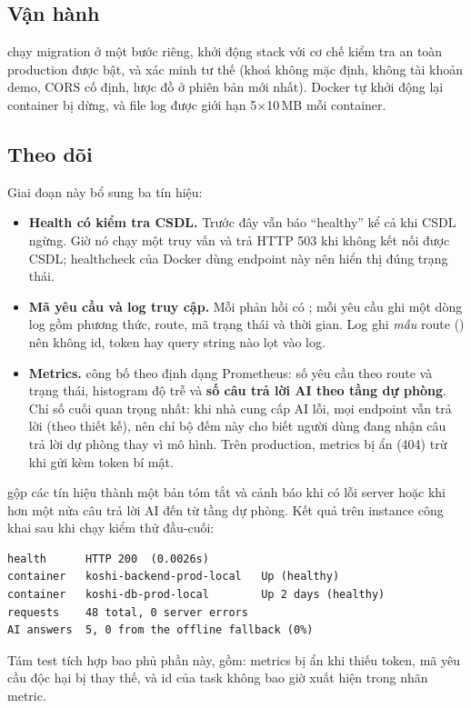 \documentclass[../main.tex]{subfiles}
\begin{document}
\subsection{Vận hành}
 chạy migration ở một bước riêng, khởi động stack với cơ chế kiểm tra
an toàn production được bật, và xác minh tư thế (khoá không mặc định, không tài khoản demo, CORS cố
định, lược đồ ở phiên bản mới nhất). Docker tự khởi động lại container bị dừng, và file log được giới
hạn 5$\times$10\,MB mỗi container.

\subsection{Theo dõi}
Giai đoạn này bổ sung ba tín hiệu:
\begin{itemize}
  \item \textbf{Health có kiểm tra CSDL.} Trước đây  vẫn báo ``healthy'' kể cả khi
        CSDL ngừng. Giờ nó chạy một truy vấn và trả HTTP 503 khi không kết nối được CSDL; healthcheck
        của Docker dùng endpoint này nên  hiển thị đúng trạng thái.
  \item \textbf{Mã yêu cầu và log truy cập.} Mỗi phản hồi có ; mỗi yêu cầu ghi một
        dòng log gồm phương thức, route, mã trạng thái và thời gian. Log ghi \emph{mẫu} route
        () nên không id, token hay query string nào lọt vào log.
  \item \textbf{Metrics.}  công bố theo định dạng Prometheus: số yêu cầu theo route
        và trạng thái, histogram độ trễ và \textbf{số câu trả lời AI theo tầng dự phòng}. Chỉ số cuối
        quan trọng nhất: khi nhà cung cấp AI lỗi, mọi endpoint vẫn trả lời (theo thiết kế), nên chỉ bộ
        đếm này cho biết người dùng đang nhận câu trả lời dự phòng thay vì mô hình. Trên production,
        metrics bị ẩn (404) trừ khi gửi kèm token bí mật.
\end{itemize}
 gộp các tín hiệu thành một bản tóm tắt và cảnh báo khi có lỗi server hoặc
khi hơn một nửa câu trả lời AI đến từ tầng dự phòng. Kết quả trên instance công khai sau khi chạy
kiểm thử đầu-cuối:
\begin{verbatim}
health      HTTP 200  (0.0026s)
container   koshi-backend-prod-local   Up (healthy)
container   koshi-db-prod-local        Up 2 days (healthy)
requests    48 total, 0 server errors
AI answers  5, 0 from the offline fallback (0%)
\end{verbatim}
Tám test tích hợp bao phủ phần này, gồm: metrics bị ẩn khi thiếu token, mã yêu cầu độc hại bị thay
thế, và id của task không bao giờ xuất hiện trong nhãn metric.
\end{document}
